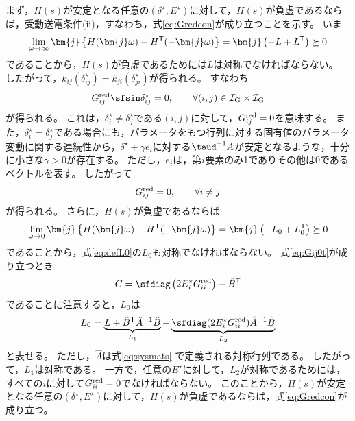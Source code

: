 \documentclass[tombow,dvipdfmx]{corona-a5-1.1}
\begin{document}
\begin{証明}
まず，$H(s)$が安定となる任意の$(\delta^{\star},E^{\star})$に対して，$H(s)$が負虚であるならば，受動送電条件(ii)，すなわち，式\ref{eq:Gredcon}が成り立つことを示す。
いま
\[
\lim_{\omega \rightarrow \infty} \bm{j}
\left\{
H(\bm{j}\omega)-H^{\sf T}(-\bm{j}\omega)
\right\}
=\bm{j}
\left(
-L+L^{\sf T}
\right) \succeq 0
\]
であることから，$H(s)$が負虚であるためには$L$は対称でなければならない。
したがって，$k_{ij}(\delta_{ij}^{\star}) = k_{ji}(\delta_{ji}^{\star})$が得られる。
すなわち
\[
G^{\rm red}_{ij} \sfsin \delta_{ij}^{\star} = 0 ,\qquad
\forall (i, j) \in \mathcal{I}_{\rm G} \times \mathcal{I}_{\rm G}
\]
が得られる。
これは，$\delta_{i}^{\star}\neq \delta_{j}^{\star}$である$(i,j)$に対して，$G^{\rm red}_{ij}=0$を意味する。
また，$\delta_{i}^{\star}= \delta_{j}^{\star}$である場合にも，パラメータをもつ行列に対する固有値のパラメータ変動に関する連続性から，$\delta^{\star}+\gamma e_i$に対する$\taud^{-1}A$が安定となるような，十分に小さな$\gamma>0$が存在する。
ただし，$e_i$は，第$i$要素のみ1でありその他は0であるベクトルを表す。
したがって
\begin{align}\label{eq:Gij0t}
G^{\rm red}_{ij}=0, \qquad
\forall i\neq j
\end{align}
が得られる。
さらに，$H(s)$が負虚であるならば
\[
\lim_{\omega \rightarrow 0} \bm{j}
\left\{
H(\bm{j}\omega)-H^{\sf T}(-\bm{j}\omega)
\right\}
=\bm{j}
\left(
-L_0+L_0^{\sf T}
\right) \succeq 0
\]
であることから，式\ref{eq:defL0}の$L_0$も対称でなければならない。
式\ref{eq:Gij0t}が成り立つとき
\[
C = \sfdiag \left(
2E_i^{\star} G^{\rm red}_{ii}
\right)  - \hat{B}^{\sf T}
\]
であることに注意すると，$L_0$は
\[
L_0 = \underbrace{ L + \hat{B}^{\sf T} \hat{A}^{-1} \hat{B} }_{L_1}
-
\underbrace{ \sfdiag (
2 E_i^{\star} G^{\rm red}_{ii}
) \hat{A}^{-1} \hat{B}
}_{L_2}
\]
と表せる。
ただし，$\hat{A}$は式\ref{eq:sysmats}
で定義される対称行列である。
したがって，$L_1$は対称である。
一方で，任意の$E^{\star}$に対して，$L_2$が対称であるためには，すべての$i$に対して$G^{\rm red}_{ii}=0$でなければならない。
このことから，$H(s)$が安定となる任意の$(\delta^{\star},E^{\star})$に対して，$H(s)$が負虚であるならば，式\ref{eq:Gredcon}が成り立つ。



\end{証明}
\end{document}
